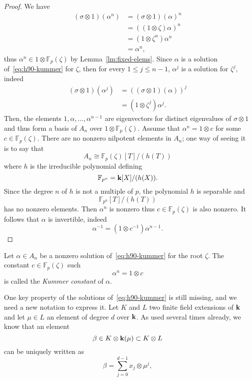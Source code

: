  \begin{proof}
  We have
  \begin{align*}
    (\sigma\otimes1)(\alpha^n) &= (\sigma\otimes1)(\alpha)^n\\
    &= ((1\otimes\zeta)\alpha)^n\\
    &= (1\otimes\zeta^n)\alpha^n\\
    &= \alpha^n,
  \end{align*}
  thus $\alpha^n\in1\otimes\mathbb{F}_p(\zeta)$ by Lemma~\ref{lm:fixed-elems}.
  Since $\alpha$ is a solution of~\eqref{eq:h90-kummer} for $\zeta$, then
  for every $1\leq j\leq n-1$, $\alpha^j$ is a solution for $\zeta^j$, indeed
  \begin{align*}
    (\sigma\otimes 1)(\alpha^j) &= ( (\sigma\otimes1)(\alpha))^j\\
    &= (1\otimes\zeta^j)\alpha^j.
  \end{align*}
  Then, the elements $1, \alpha, \dots, \alpha^{n-1}$ are eigenvectors for
  distinct eigenvalues of $\sigma\otimes1$ and thus form a basis of $A_n$ over
  $1\otimes \mathbb{F}_{p}(\zeta)$. Assume that $\alpha^n=1\otimes c$ for some
  $c\in\mathbb{F}_{p}(\zeta)$. There are no nonzero nilpotent elements in $A_n$;
  one way of seeing it is to say that
  \[
    A_n \cong \mathbb{F}_{p}(\zeta)[T]/(h(T))
  \]
  where $h$ is the irreducible polynomial defining
  \[
    \mathbb{F}_{p^n} = \mathbf{k}[X]/(h(X)).
  \]
  Since the degree $n$ of
  $h$ is not a multiple of $p$, the polynomial $h$ is separable and 
  \[
    \mathbb{F}_{p^n}[T]/(h(T))
  \]
  has no nonzero elements. Then $\alpha^n$ is nonzero thus
  $c\in\mathbb{F}_p(\zeta)$ is also nonzero. It follows that $\alpha$ is
  invertible, indeed
  \[
    \alpha^{-1} = (1\otimes c^{-1})\alpha^{n-1}.
  \]
 \end{proof}
 \begin{defi}
   Let $\alpha\in A_n$ be a nonzero solution of~\eqref{eq:h90-kummer} for the
   root $\zeta$. The constant $c\in\mathbb{F}_p(\zeta)$ such
   \[
     \alpha^n = 1\otimes c
   \]
   is called the \emph{Kummer constant} of $\alpha$.
 \end{defi}
 One key property of the solutions of~\eqref{eq:h90-kummer} is still missing,
 and we need a new notation to express it. Let $K$ and $L$ two finite field
 extensions of $\mathbf{k}$ and let $\mu\in L$ an element of degree $d$ over $\mathbf{k}$. As
 used several times already, we know that an element 
 \[
   \beta\in K\otimes \mathbf{k}(\mu)\subset K\otimes L 
 \]
   can be uniquely written as
 \[
   \beta=\sum_{j=0}^{d-1}x_j\otimes\mu^j,
 \]
